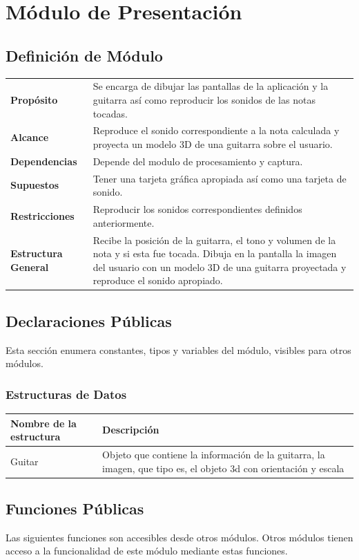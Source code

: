 \documentclass[a4paper,10pt]{article}
\begin{document}
\section{Módulo de Presentación}
\label{sec:presentacion}
\subsection{Definición de Módulo}
\begin{tabularx}{\textwidth}{p{25mm} X}
        \textbf{Propósito} & Se encarga de dibujar las pantallas de la aplicación y la guitarra así como reproducir los sonidos de las notas tocadas.\\
        \textbf{Alcance} & Reproduce el sonido correspondiente a la nota calculada y proyecta un modelo 3D de una guitarra sobre el usuario.\\
        \textbf{Dependencias} & Depende del modulo de procesamiento y captura.\\
        \textbf{Supuestos} & Tener una tarjeta gráfica apropiada así como una tarjeta de sonido.\\
        \textbf{Restricciones} & Reproducir los sonidos correspondientes definidos anteriormente.\\
        \textbf{Estructura General} & Recibe la posición de la guitarra, el
        tono y volumen de la nota y si esta fue tocada. Dibuja en la pantalla
        la imagen del usuario con un modelo 3D de una guitarra proyectada y
        reproduce el sonido apropiado.\\
\end{tabularx}
\subsection{Declaraciones Públicas}
Esta sección enumera constantes, tipos y variables del módulo, visibles para
otros módulos.
\subsubsection{Estructuras de Datos}
\begin{tabular}{| p{30mm} | p{10cm} |}
        \hline
        \textbf{Nombre de la \mbox{estructura}} & \textbf{Descripción} \\
        \hline
        Guitar & Objeto que contiene la información de la guitarra, la imagen, que tipo es, el objeto 3d con orientación y escala\\
        \hline
\end{tabular}
\subsection{Funciones Públicas}
Las siguientes funciones son accesibles desde otros módulos. Otros módulos
tienen acceso a la funcionalidad de este módulo mediante estas funciones.~\\
\end{document}
